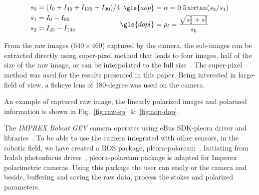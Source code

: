 \begin{subequations}
  \begin{align}
    \label{eq:stokes1}
    \small
    s_0 & = (I_0 + I_{45} + I_{135} + I_{90})/4\\ \nonumber
    s_1 & = I_0 - I_{90} \\ \nonumber
    s_2 & = I_{45} - I_{135} \nonumber
  \end{align}
  \begin{align}
    \label{eq:stokes2}
    \small
    \gls{aop} & = \alpha = 0.5 \arctan(s_2/s_1) \\ \nonumber
    \gls{dopl} & = \rho_l = \frac{\sqrt{s_2^{2} + s_1^{2}}}{s_0} \nonumber
  \end{align}
  \label{eq:stokes}
\end{subequations}

From the raw images ($640\times460$) captured by the camera, the sub-images can
be extracted directly using super-pixel method that leads to four images, half
of the size of the raw image, or can be interpolated to the full
size~\cite{ratliff2009interpolationmicrogrid,gao2011bilinearpolarimeters}.  The
super-pixel method was used for the results presented in this paper. Being
interested in large-field of view, a fisheye lens of 180-degree was used on the
camera.

An example of captured raw image, the linearly polarized images and polarized
information is shown in Fig.~\ref{fig:raw-sp}~$\&$~\ref{fig:aop-dop}.

The \textit{IMPREX Bobcat GEV} camera operates using eBus SDK-pleora driver and
libraries~\cite{eBus}. To be able to use the camera integrated with other
sensors, in the robotic field, we have created a ROS
package, pleora-polarcam~\cite{pleora_polarcam}.
Initiating from Iralab photonfocus driver~\cite{ira}, pleora-polarcam package
is adapted for Imperex polarimetric cameras.
Using this package the user can easily  or  the
camera and beside, buffering and saving the raw data, process the stokes and
polarized parameters.



